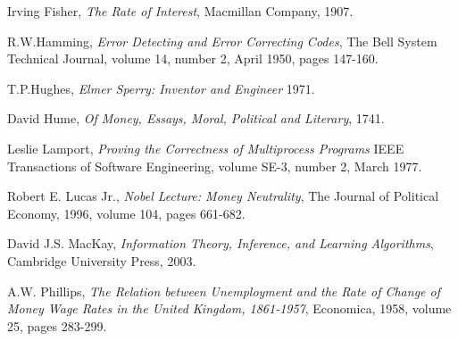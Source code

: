 \begin{thebibliography}{9}
    Irving Fisher,
    \emph{The Rate of Interest},
    Macmillan Company,
    1907.

    R.W.Hamming,
    \emph{Error Detecting and Error Correcting Codes},
    The Bell System Technical Journal,
    volume 14,
    number 2,
    April 1950,
    pages 147-160.

    T.P.Hughes,
    \emph{Elmer Sperry: Inventor and Engineer}
    1971.

    David Hume,
    \emph{Of Money, Essays, Moral, Political and Literary},
    1741.

% 
% 

    Leslie Lamport,
    \emph{Proving the Correctness of Multiprocess Programs}
    IEEE Transactions of Software Engineering,
    volume SE-3,
    number 2,
    March 1977.

    Robert E. Lucas Jr.,
    \emph{Nobel Lecture: Money Neutrality},
    The Journal of Political Economy,
    1996,
    volume 104,
    pages 661-682.

    David J.S. MacKay,
    \emph{Information Theory, Inference, and Learning Algorithms},
    Cambridge University Press,
    2003.


    A.W. Phillips,
    \emph{The Relation between Unemployment and the Rate of Change of Money Wage Rates in the United Kingdom, 1861-1957},
    Economica,
    1958,
    volume 25,
    pages 283-299.



\end{thebibliography}

